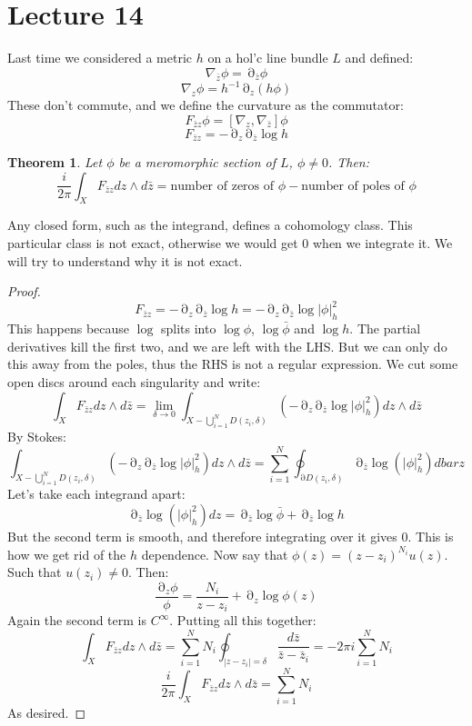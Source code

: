 \documentclass[12 pt]{article}
\DeclareMathOperator {\p} {\partial}
\theoremstyle{plain}
\newtheorem*{thm*}{Theorem}
\theoremstyle{definition}
\theoremstyle{remark}
\begin{document}
\section*{Lecture 14}
Last time we considered a metric $h$ on a hol'c line bundle $L$ and defined:
\[      \nabla_{\bar z} \phi = \p_{\bar z} \phi        \]
\[      \nabla_{ z} \phi = h^{-1} \p_z(h \phi)        \]
These don't commute, and we define the curvature as the commutator:
\[     F_{\bar z z} \phi = [ \nabla_{z} , \nabla_{\bar z} ] \phi      \]
\[     F_{\bar z z} = - \p_z \p_{\bar z} \log h   \]
\begin{thm*}
Let $\phi$ be a meromorphic section of $L$, $\phi \neq 0$. Then:
\[      \frac{i}{2\pi} \int_X F_{\bar z z} dz \wedge d\bar z = \text{number of zeros of } \phi - \text{number of poles of } \phi      \]
\end{thm*}
Any closed form, such as the integrand, defines a cohomology class. This particular class is not exact, otherwise we would get 0 when we integrate it. We will try to understand why it is not exact.
\begin{proof}
\[    F_{\bar z z} = - \p_z \p_{\bar z} \log h = - \p_z \p_{\bar z} \log |\phi|^2_h    \]
This happens because $\log$ splits into $\log \phi$, $\log \bar \phi$ and $\log h$. The partial derivatives kill the first two, and we are left with the LHS. But we can only do this away from the poles, thus the RHS is not a regular expression. We cut some open discs around each singularity and write:
\[        \int_X F_{\bar z z} dz \wedge d\bar z = \lim_{\delta \to 0} \int_{X - \bigcup_{i=1}^N D(z_i, \delta)}   ( - \p_z \p_{\bar z} \log |\phi|^2_h) dz\wedge d\bar z    \]
By Stokes:
\[     \int_{X - \bigcup_{i=1}^N D(z_i, \delta)}   ( - \p_z \p_{\bar z} \log |\phi|^2_h) dz\wedge d\bar z = \sum_{i=1}^N \oint_{\p D(z_i, \delta)} \p_{\bar z} \log(|\phi|^2_h) d bar z       \]
Let's take each integrand apart:
\[     \p_{\bar z} \log(|\phi|^2_h) dz   =   \p_{\bar z} \log \bar \phi + \p_{\bar z} \log h    \]
But the second term is smooth, and therefore integrating over it gives 0. This is how we get rid of the $h$ dependence. Now say that $\phi(z) = (z-z_i)^{N_i} u(z)$. Such that $u(z_i) \neq 0$. Then:
\[      \frac{\p_z \phi}{\phi} = \frac{N_i}{z-z_i} + \p_z \log \phi(z)   \]
Again the second term is $C^{\infty}$. Putting all this together:
\[      \int_X F_{\bar z z} dz \wedge d\bar z  =  \sum_{i=1}^N N_i \oint_{|z-z_i| = \delta} \frac{d\bar z}{\bar z - \bar z_i}  = - 2\pi i \sum_{i=1}^N N_i  \]
\[      \frac{i}{2\pi}       \int_X F_{\bar z z} dz \wedge d\bar z  = \sum_{i=1}^N N_i   \]
As desired.
\end{proof}
\end{document}

